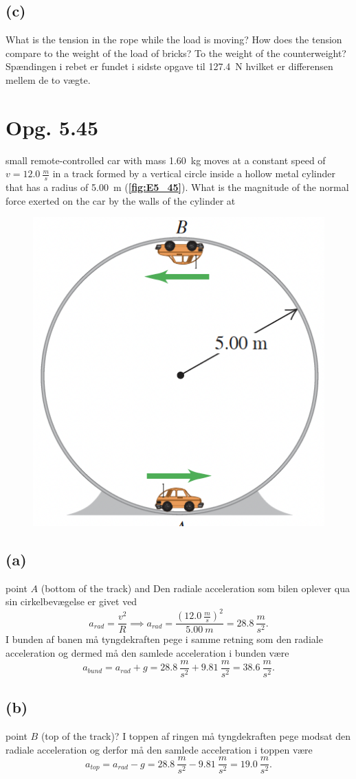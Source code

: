 \documentclass[12pt]{article}
\begin{document}
\subsection*{(c)}
What is the tension in the rope while the load is moving? How does the tension compare to the weight of the load of bricks? To the weight of the counterweight?
\bigbreak
Spændingen i rebet er fundet i sidste opgave til \qty{127,4}{N} hvilket er differensen mellem de to vægte.  


\section*{Opg. 5.45}
small remote-controlled car with mass \qty{1.60}{kg} moves at a constant speed of $v = \qty{12.0}{\frac{m}{s}}$ in a track formed by a vertical circle inside a hollow metal cylinder that has a radius of  \qty{5.00}{m} (\textbf{\autoref{fig:E5_45}}). What is the magnitude of the normal force exerted on the car by the walls of the cylinder at

\begin{figure} [ht]
  \centering
  \caption{}
  \includegraphics[width=0.25\linewidth]{../figures/E5_45.png}
  \label{fig:E5_45}
\end{figure}

\subsection*{(a)}
point $A$ (bottom of the track) and
\bigbreak
Den radiale acceleration som bilen oplever qua sin cirkelbevægelse er givet ved
\[
  a_{rad} = \frac{v^2}{R} \implies a_{rad} = \frac{(\qty{12,0}{\frac{m}{s}})^2}{\qty{5,00}{m}} = \qty{28,8}{\frac{m}{s^2}} 
.\] 
I bunden af banen må tyngdekraften pege i samme retning som den radiale acceleration og dermed må den samlede acceleration i bunden være
\[
a_{bund} = a_{rad} + g = \qty{28,8}{\frac{m}{s^2}} + \qty{9,81}{\frac{m}{s^2}} = \qty{38,6}{\frac{m}{s^2}}
.\] 

\subsection*{(b)}
point $B$ (top of the track)?
\bigbreak
I toppen af ringen må tyngdekraften pege modsat den radiale acceleration og derfor må den samlede acceleration i toppen være
\[
a_{top} = a_{rad} - g = \qty{28,8}{\frac{m}{s^2}} - \qty{9,81}{\frac{m}{s^2}} = \qty{19,0}{\frac{m}{s^2}}
.\] 
  
\end{document}

